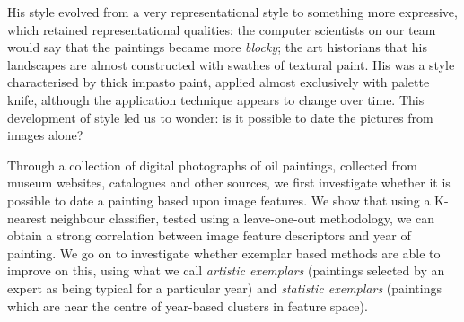 \documentclass[conference,a4paper]{IEEEtran}
\begin{document}
His style evolved from a very representational style to something more
expressive, which retained representational qualities: the computer scientists
on our team would say that the paintings became more \emph{blocky}; the art
historians that his landscapes are almost constructed with swathes of textural
paint. His was a style characterised by thick impasto paint, applied almost
exclusively with palette knife, although the application technique appears to
change over time. This development of style led us to wonder: is it possible to
date the pictures from images alone?

Through a collection of digital photographs of oil paintings, collected from
museum websites, catalogues and other sources, we first investigate whether it
is possible to date a painting based upon image features. We show that using a
K-nearest neighbour classifier, tested using a leave-one-out methodology, we
can obtain a strong correlation between image feature descriptors and year of
painting. We go on to investigate whether exemplar based methods are able to
improve on this, using what we call \emph{artistic exemplars} (paintings
selected by an expert as being typical for a particular year) and
\emph{statistic exemplars} (paintings which are near the centre of year-based
clusters in feature space).

\end{document}
